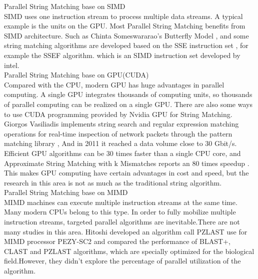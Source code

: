 \documentclass[11pt]{article}       %
\begin{document}
Parallel String Matching base on SIMD\\
SIMD uses one instruction stream to process multiple data streams. A typical example is the units on the GPU. Most Parallel String Matching benefits from SIMD architecture. Such as Chinta Someswararao's Butterfly Model \cite{Butterfly}, and some string matching algorithms are developed based on the SSE instruction set \cite{Matching}, for example the SSEF algorithm. which is an SIMD instruction set developed by intel. \\

Parallel String Matching base on GPU(CUDA)\\
Compared with the CPU, modern GPU has huge advantages in parallel computing. A single GPU integrates thousands of computing units, so thousands of parallel computing can be realized on a single GPU. There are also some ways to use CUDA programming provided by Nvidia GPU for String Matching. Giorgos Vasiliadis implements string search and regular expression matching operations for real-time inspection of network packets through the pattern matching library \cite{Bit-Parallel}, And in 2011 it reached a data volume close to 30 Gbit/s. Efficient GPU algorithms can be 30 times faster than a single CPU core, and Approximate String Matching with k Mismatches reports an 80 times speedup \cite{pattern-matching}. This makes GPU computing have certain advantages in cost and speed, but the research in this area is not as much as the traditional string algorithm. \\


Parallel String Matching base on MIMD\\
MIMD machines can execute multiple instruction streams at the same time. Many modern CPUs belong to this type. In order to fully mobilize multiple instruction streams, targeted parallel algorithms are inevitable.There are not many studies in this area. Hitoshi developed an algorithm call PZLAST use for MIMD processor PEZY-SC2 and compared the performance of BLAST+, CLAST and PZLAST algorithms\cite{MIMD}, which are specially optimized for the biological field.However, they didn't explore the percentage of parallel utilization of the algorithm.\\
\end{document}
